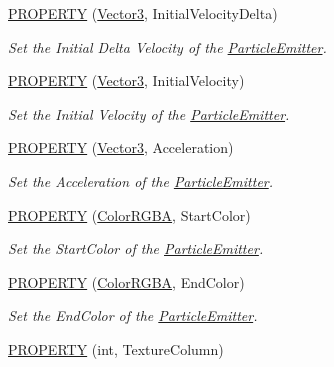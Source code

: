 \begin{DoxyCompactItemize}
\hyperlink{class_magnum_1_1_particle_emitter_aaa30ae0192427a4e4b4f3238b10f3b5a}{P\+R\+O\+P\+E\+R\+TY} (\hyperlink{class_magnum_1_1_vector3}{Vector3}, Initial\+Velocity\+Delta)
\begin{DoxyCompactList}\small\item\em Set the Initial Delta Velocity of the \hyperlink{class_magnum_1_1_particle_emitter}{Particle\+Emitter}. \end{DoxyCompactList}\item 
\hyperlink{class_magnum_1_1_particle_emitter_acf3b3b2808b5a5d9174751682c4c1ced}{P\+R\+O\+P\+E\+R\+TY} (\hyperlink{class_magnum_1_1_vector3}{Vector3}, Initial\+Velocity)
\begin{DoxyCompactList}\small\item\em Set the Initial Velocity of the \hyperlink{class_magnum_1_1_particle_emitter}{Particle\+Emitter}. \end{DoxyCompactList}\item 
\hyperlink{class_magnum_1_1_particle_emitter_acebfaca39514da4fb5dd6513d7ea198f}{P\+R\+O\+P\+E\+R\+TY} (\hyperlink{class_magnum_1_1_vector3}{Vector3}, Acceleration)
\begin{DoxyCompactList}\small\item\em Set the Acceleration of the \hyperlink{class_magnum_1_1_particle_emitter}{Particle\+Emitter}. \end{DoxyCompactList}\item 
\hyperlink{class_magnum_1_1_particle_emitter_aa3d4f6f42b2a9efdc37d32a15a01ce0a}{P\+R\+O\+P\+E\+R\+TY} (\hyperlink{class_magnum_1_1_color_r_g_b_a}{Color\+R\+G\+BA}, Start\+Color)
\begin{DoxyCompactList}\small\item\em Set the Start\+Color of the \hyperlink{class_magnum_1_1_particle_emitter}{Particle\+Emitter}. \end{DoxyCompactList}\item 
\hyperlink{class_magnum_1_1_particle_emitter_aa6e63b1fcc45353c6dea4e874977253c}{P\+R\+O\+P\+E\+R\+TY} (\hyperlink{class_magnum_1_1_color_r_g_b_a}{Color\+R\+G\+BA}, End\+Color)
\begin{DoxyCompactList}\small\item\em Set the End\+Color of the \hyperlink{class_magnum_1_1_particle_emitter}{Particle\+Emitter}. \end{DoxyCompactList}\item 
\hyperlink{class_magnum_1_1_particle_emitter_ada5001864a35bf935c49dfb54a794df8}{P\+R\+O\+P\+E\+R\+TY} (int, Texture\+Column)

\end{DoxyCompactItemize}

